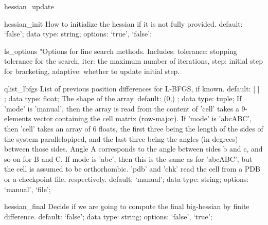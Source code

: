 \begin{ipifield}{}
\begin{ipifield}{hessian\_update}
{}
\end{ipifield}
\begin{ipifield}{hessian\_init}%
{How to initialize the hessian if it is not fully provided.}%
{default: `false'; data type: string; options: `true', `false'; }%
{}
\end{ipifield}
\begin{ipifield}{ls\_options}%
{"Options for line search methods. Includes:
                                  tolerance: stopping tolerance for the search,
                                  iter: the maximum number of iterations,
                                  step: initial step for bracketing,
                                  adaptive: whether to update initial step.
                                  }%
{}%
{}
\end{ipifield}
\begin{ipifield}{qlist\_lbfgs}%
{List of previous position differences for L-BFGS, if known.}%
{default:  [ ] ; data type: float; }%
{%
{The shape of the array.}%
{default:  (0,) ; data type: tuple; }%
%
{If 'mode' is 'manual', then the array is read from the content of 'cell' takes a 9-elements vector containing the cell matrix (row-major). If 'mode' is 'abcABC', then 'cell' takes an array of 6 floats, the first three being the length of the sides of the system parallelopiped, and the last three being the angles (in degrees) between those sides. Angle A corresponds to the angle between sides b and c, and so on for B and C. If mode is 'abc', then this is the same as for 'abcABC', but the cell is assumed to be orthorhombic. 'pdb' and 'chk' read the cell from a PDB or a checkpoint file, respectively.}%
{default: `manual'; data type: string; options: `manual', `file'; }%
}
\end{ipifield}
\begin{ipifield}{hessian\_final}%
{Decide if we are going to compute the final big-hessian by finite difference.}%
{default: `false'; data type: string; options: `false', `true'; }%
{}
\end{ipifield}
\end{ipifield}
